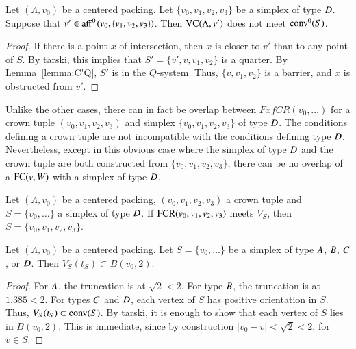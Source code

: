 \begin{lemma}
Let $(\Lambda,v_0)$ be a centered packing.  Let $\{v_0,v_1,v_2,v_3\}$ be a simplex
of type $D$. 
Suppose that $v'\in{\operatorname{aff}}_+^0(v_0,\{v_1,v_2,v_3\})$.  Then ${\operatorname{VC}}(\Lambda,v')$ does
not meet ${\operatorname{conv}}^0(S)$.
\end{lemma}

\begin{proof} If there is a point $x$ of intersection, then
$x$ is closer to $v'$ than to any point of $S$. 
By tarski, this implies that 
$S'=\{v',v,v_1,v_2\}$ is a quarter.  By Lemma~\ref{lemma:C'Q},
$S'$ is in the $Q$-system.  Thus, $\{v,v_1,v_2\}$ is a barrier,
and $x$ is obstructed from $v'$.
\end{proof}


Unlike the other cases, there can in fact be overlap between 
$FxfCR(v_0,\ldots)$ for a crown tuple $(v_0,v_1,v_2,v_3)$ and simplex $\{v_0,v_1,v_2,v_3\}$ 
of type $D$.  The
conditions defining a crown tuple are not incompatible with
the conditions defining type $D$.  Nevertheless, except in this
obvious case where the simplex of type $D$ and the crown tuple are both
constructed from $\{v_0,v_1,v_2,v_3\}$, there
can be no overlap of a ${\operatorname{FC}}(v,W)$ with a simplex of type
$D$.

\begin{lemma}
Let $(\Lambda,v_0)$ be a centered packing, $(v_0,v_1,v_2,v_3)$ a crown tuple and $S=\{v_0,\ldots\}$ a
simplex of type $D$.  If ${\operatorname{FCR}}(v_0,v_1,v_2,v_3)$ meets $V_S$, then
$S = \{v_0,v_1,v_2,v_3\}$.
\end{lemma}



\begin{lemma}
Let $(\Lambda,v_0)$ be a centered packing.  Let $S=\{v_0,\ldots\}$ be a simplex of type
$A$, $B$, $C$, or $D$.  Then $V_S(t_S)\subset B(v_0,2)$.
\end{lemma}

\begin{proof}  For $A$, the truncation is at $\sqrt2 < 2$.  For type $B$, the truncation
is at $1.385 < 2$.  For types $C$ and $D$, each vertex of $S$ has positive orientation in
$S$.  Thus,  $V_S(t_S) \subset {\operatorname{conv}}(S)$.  By tarski, 
it is enough to show that each vertex
of $S$ lies in $B(v_0,2)$.  This is immediate, since by construction $|v_0-v|<\sqrt2 < 2$, for $v\in S$.
\end{proof}

